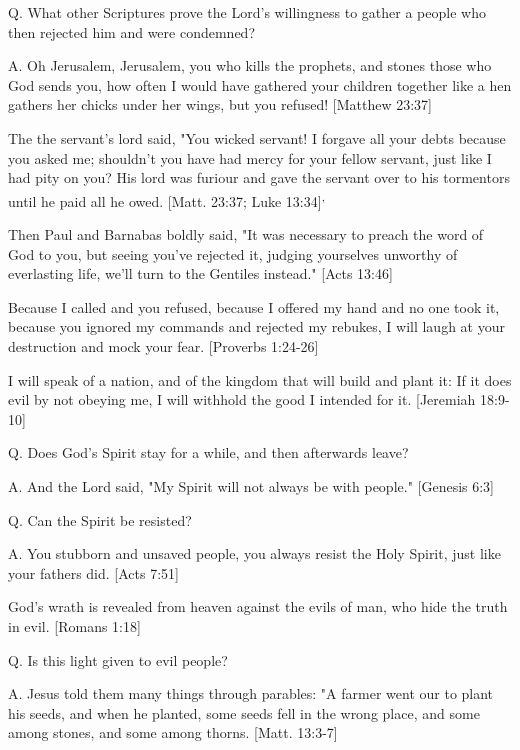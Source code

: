 \documentclass[../main.tex]{subfiles}
\begin{document}
	Q. What other Scriptures prove the Lord's willingness to gather a people who then rejected him and were condemned?

	A. Oh Jerusalem, Jerusalem, you who kills the prophets, and stones those who God sends you, how often I would have gathered your children together like a hen gathers her chicks under her wings, but you refused! [Matthew 23:37]

	The the servant's lord said, "You wicked servant! I forgave all your debts because you asked me; shouldn't you have had mercy for your fellow servant, just like I had pity on you? His lord was furiour and gave the servant over to his tormentors until he paid all he owed. [Matt. 23:37; Luke 13:34]\textsuperscript{,}

	Then Paul and Barnabas boldly said, "It was necessary to preach the word of God to you, but seeing you've rejected it, judging yourselves unworthy of everlasting life, we'll turn to the Gentiles instead." [Acts 13:46]

	Because I called and you refused, because I offered my hand and no one took it, because you ignored my commands and rejected my rebukes, I will laugh at your destruction and mock your fear. [Proverbs 1:24-26]

	I will speak of a nation, and of the kingdom that will build and plant it: If it does evil by not obeying me, I will withhold the good I intended for it. [Jeremiah 18:9-10]

	Q. Does God's Spirit stay for a while, and then afterwards leave?

	A. And the Lord said, "My Spirit will not always be with people." [Genesis 6:3]

	Q. Can the Spirit be resisted?

	A. You stubborn and unsaved people, you always resist the Holy Spirit, just like your fathers did. [Acts 7:51]

	God's wrath is revealed from heaven against the evils of man, who hide the truth in evil. [Romans 1:18]

	Q. Is this light given to evil people?

	A. Jesus told them many things through parables: "A farmer went our to plant his seeds, and when he planted, some seeds fell in the wrong place, and some among stones, and some among thorns. [Matt. 13:3-7]
\end{document}
